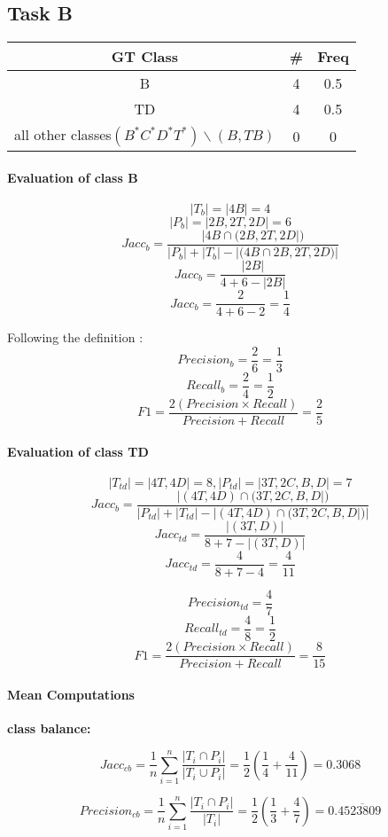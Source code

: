 \documentclass[10pt]{article}
\begin{document}
\subsection{Task B}
\begin{center}
\begin{tabular}{ c c c }
 GT Class & \# & Freq  \\
 \hline
 B & 4 &  0.5  \\ 
 TD & 4 & 0.5   \\ 
 all other classes$(B^*C^*D^*T^*)\backslash (B,TB)$ & 0 & 0 
\end{tabular}
\end{center}
\paragraph{Evaluation of class B}
$$|T_b| = |4B| = 4 $$ 
$$|P_b| = |2B,2T,2D| = 6$$
$$Jacc_b = \frac{|4B\cap{(2B,2T,2D}|)}{|P_b|+|T_b|-|(4B\cap{2B,2T,2D)}|}$$
$$Jacc_b = \frac{|2B|}{4+6-|2B|}$$
$$Jacc_b = \frac{2}{4+6-2} = \frac{1}{4}$$

Following the definition :
$$Precision_b = \frac{2}{6} = \frac{1}{3}$$
$$Recall_b = \frac{2}{4} = \frac{1}{2}$$
$$F1 = \frac{2(Precision\times Recall)}{Precision + Recall} = \frac{2}{5}$$

\paragraph{Evaluation of class TD}  
$$|T_{td}| = |4T,4D| = 8, |P_{td}| = |3T,2C,B,D| = 7$$
$$Jacc_b = \frac{|(4T,4D)\cap{(3T,2C,B,D}|)}{|P_{td}|+|T_{td}|-|(4T,4D)\cap{(3T,2C,B,D}|)|}$$
$$Jacc_{td} = \frac{|(3T,D)|}{8+7-|(3T,D)|}$$
$$Jacc_{td} = \frac{4}{8+7-4} = \frac{4}{11}$$

$$Precision_{td} = \frac{4}{7}$$
$$Recall_{td} = \frac{4}{8} = \frac{1}{2}$$
$$F1 = \frac{2(Precision\times Recall)}{Precision + Recall} = \frac{8}{15}$$

\paragraph{Mean Computations\\}

\textbf{class balance:}

 $$Jacc_{cb} =\frac{1}{n}\sum_{i=1}^{n} \frac{|{T_i}\cap{P_i}|}{|{T_i}\cup{P_i}|} = \frac{1}{2}\left(\frac{1}{4}+\frac{4}{11}\right)= 0.3068$$
 
$$Precision_{cb} =\frac{1}{n}\sum_{i=1}^{n} \frac{|{T_i}\cap{P_i}|}{|T_i|}= \frac{1}{2}\left(\frac{1}{3}+\frac{4}{7}\right) = 0.4\overline{523809}$$
\end{document}

